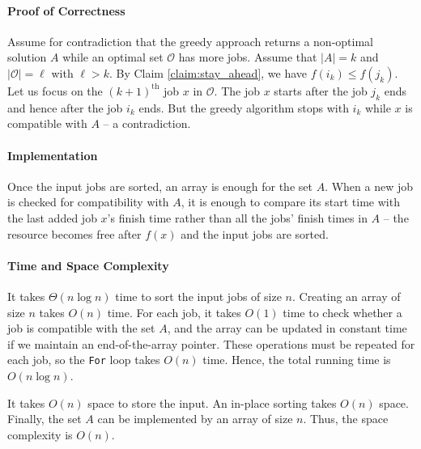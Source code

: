 \documentclass[11pt]{332homework}
\newcommand{\ord}[2][th]{\ensuremath{{#2}^{\mathrm{#1}}}}
\newcommand{\Ocal}{\ensuremath{\mathcal{O}}}
\begin{document}
\paragraph{Proof of Correctness}
Assume for contradiction that the greedy approach returns a
non-optimal solution $A$ while an optimal set $\Ocal$ has more
jobs. Assume that $|A|=k$ and $|\Ocal|=\ell$ with $\ell > k$.
By Claim \ref{claim:stay_ahead}, we have $f(i_k)\leq f(j_k)$.
Let us focus on the $\ord{(k+1)}$ job $x$ in $\Ocal$. The job $x$ starts
after the job $j_k$ ends and hence after the job $i_k$ ends.
But the greedy algorithm stops with $i_k$ while $x$ is compatible with
$A$ -- a contradiction.

\paragraph{Implementation}
Once the input jobs are sorted, an array is enough for the set $A$.
When a new job is checked for compatibility with $A$, it is
enough to compare its start time with the last added job $x$'s finish time rather
than all the jobs' finish  times in
$A$ -- the resource becomes free after $f(x)$ and the input jobs are
sorted.

\paragraph{Time and Space Complexity}
It takes $\Theta(n \log n)$ time to sort the input jobs of size $n$.
Creating an array of size $n$ takes $O(n)$ time.
For each job, it takes $O(1)$ time to check whether a job is
compatible with the set $A$, and the array can be updated in
constant time if we maintain an end-of-the-array pointer.
These operations must be repeated for each job, so the \texttt{For}
loop takes $O(n)$ time. Hence, the total running time is
$O(n\log n)$.

It takes $O(n)$ space to store the input. An in-place
sorting takes $O(n)$ space. Finally, the set $A$ can be implemented
by an array of size $n$. Thus, the space complexity is $O(n)$.
\end{document}
